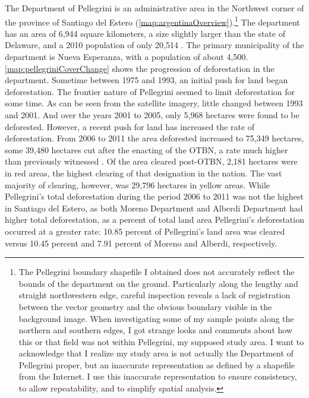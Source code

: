 The Department of Pellegrini is an administrative area in the Northwest corner of the province of Santiago del Estero (\autoref{map:argentinaOverview}).\footnote{The Pellegrini boundary shapefile I obtained does not accurately reflect the bounds of the department on the ground. Particularly along the lengthy and straight northwestern edge, careful inspection reveals a lack of registration between the vector geometry and the obvious boundary visible in the background image. When investigating some of my sample points along the northern and southern edges, I got strange looks and comments about how this or that field was not within Pellegrini, my supposed study area. I want to acknowledge that I realize my study area is not actually the Department of Pellegrini proper, but an inaccurate representation as defined by a shapefile from the Internet. I use this inaccurate representation to ensure consistency, to allow repeatability, and to simplify spatial analysis.} The department has an area of 6,944 square kilometers, a size slightly larger than the state of Delaware, and a 2010 population of only 20,514 \autocite{estadistica-y-c2010b}. The primary municipality of the department is Nueva Esperanza, with a population of about 4,500. \autoref{map:pellegriniCoverChange} shows the progression of deforestation in the department. Sometime between 1975 and 1993, an initial push for land began deforestation. The frontier nature of Pellegrini seemed to limit deforestation for some time. As can be seen from the satellite imagery, little changed between 1993 and 2001. And over the years 2001 to 2005, \textcite{volante2005analisis} only 5,968 hectares were found to be deforested. However, a recent push for land has increased the rate of deforestation. From 2006 to 2011 the area deforested increased to 75,349 hectares, some 39,480 hectares cut after the enacting of the OTBN, a rate much higher than previously witnessed \autocite{secreteria-de-a2012monitoreo}. Of the area cleared post-OTBN, 2,181 hectares were in red areas, the highest clearing of that designation in the nation. The vast majority of clearing, however, was 29,796 hectares in yellow areas. While Pellegrini’s total deforestation during the period 2006 to 2011 was not the highest in Santiago del Estero, as both Moreno Department and Alberdi Department had higher total deforestation, as a percent of total land area Pellegrini’s deforestation occurred at a greater rate: 10.85 percent of Pellegrini’s land area was cleared versus 10.45 percent and 7.91 percent of Moreno and Alberdi, respectively.

